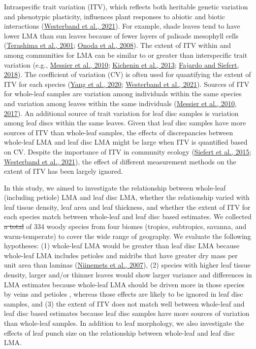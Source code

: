 \documentclass[
  12pt,
  a4paper,
,tablecaptionabove
]{scrartcl}
\providecommand{\DIFaddtex}[1]{{\protect\color{blue}\uwave{#1}}} %
\providecommand{\DIFdeltex}[1]{{\protect\color{red}\sout{#1}}}                      %
\providecommand{\DIFaddbegin}{} %
\providecommand{\DIFaddend}{} %
\providecommand{\DIFdelbegin}{} %
\providecommand{\DIFdelend}{} %
\providecommand{\DIFadd}[1]{\texorpdfstring{\DIFaddtex{#1}}{#1}} %
\providecommand{\DIFdel}[1]{\texorpdfstring{\DIFdeltex{#1}}{}} %
\begin{document}
Intraspecific trait variation (ITV), which reflects both heritable genetic variation and phenotypic plasticity, influences plant responses to abiotic and biotic interactions (\protect\hyperlink{ref-Westerband2021}{Westerband et al., 2021}).
For example, shade leaves tend to have lower LMA than sun leaves because of fewer layers of palisade mesophyll cells (\protect\hyperlink{ref-Terashima2001}{Terashima et al., 2001}; \protect\hyperlink{ref-Onoda2008}{Onoda et al., 2008}).
The extent of ITV within and among communities for LMA can be similar to or greater than interspecific trait variation (e.g., \protect\hyperlink{ref-Messier2010}{Messier et al., 2010}; \protect\hyperlink{ref-Kichenin2013}{Kichenin et al., 2013}; \protect\hyperlink{ref-Fajardo2018}{Fajardo and Siefert, 2018}).
The coefficient of variation (CV) is often used for quantifying the extent of ITV for each species (\protect\hyperlink{ref-Yang2020}{Yang et al., 2020}; \protect\hyperlink{ref-Westerband2021}{Westerband et al., 2021}).
Sources of ITV for whole-leaf samples are variation among individuals within the same species and variation among leaves within the same individuals (\protect\hyperlink{ref-Messier2010}{Messier et al., 2010}, \protect\hyperlink{ref-Messier2017}{2017}).
An additional source of trait variation for leaf disc samples is variation among leaf discs within the same leaves.
Given that leaf disc samples have more sources of ITV than whole-leaf samples, the effects of discrepancies between whole-leaf LMA and leaf disc LMA might be large when ITV is quantified based on CV.
Despite the importance of ITV in community ecology (\protect\hyperlink{ref-Siefert2015}{Siefert et al., 2015}; \protect\hyperlink{ref-Westerband2021}{Westerband et al., 2021}), the effect of different measurement methods on the extent of ITV has been largely ignored.

In this study, we aimed to investigate the relationship between whole-leaf (including petiole) LMA and leaf disc LMA,
whether the relationship varied with leaf tissue density, leaf area and leaf thickness, and
whether the extent of ITV for each species match between whole-leaf and leaf disc based estimates.
We collected \DIFdelbegin \DIFdel{a total }\DIFdelend \DIFaddbegin \DIFadd{leaves from 1459 individuals }\DIFaddend of 334 woody species from four biomes (tropics, subtropics, savanna, and warm-temperate) to cover the wide range of geography.
We evaluate the following hypotheses:
(1) whole-leaf LMA would be greater than leaf disc LMA because whole-leaf LMA includes petioles and midribs that have greater dry mass per unit area than laminas (\protect\hyperlink{ref-Niinemets2007}{Niinemets et al., 2007}),
(2) species with higher leaf tissue density, larger and/or thinner leaves would show larger variance and differences in LMA estimates because whole-leaf LMA should be driven more in those species by veins and petioles , whereas those effects are likely to be ignored in leaf disc samples, and
(3) the extent of ITV does not match well between whole-leaf and leaf disc based estimates because leaf disc samples have more sources of variation than whole-leaf samples.
In addition to leaf morphology, we also investigate the effects of leaf punch size on the relationship between whole-leaf and leaf disc LMA.
\end{document}
